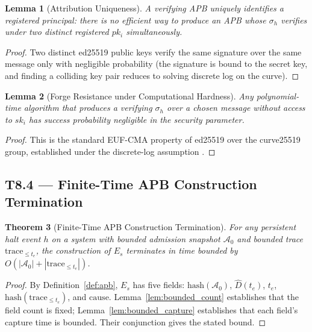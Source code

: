 \documentclass[11pt]{article}
\newtheorem{theorem}{Theorem}[section]
\newtheorem{lemma}[theorem]{Lemma}
\newcommand{\Azero}{\mathcal{A}_0}
\newcommand{\Dhat}{\widehat{D}}
\newcommand{\Es}{E_s}
\newcommand{\sigh}{\sigma_h}
\newcommand{\ski}{sk_i}
\newcommand{\pki}{pk_i}
\begin{document}
\begin{lemma}[Attribution Uniqueness]
\label{lem:attribution}
A verifying APB uniquely identifies a registered principal: there is
no efficient way to produce an APB whose $\sigh$ verifies under two
distinct registered $\pki$ simultaneously.
\end{lemma}

\begin{proof}
Two distinct ed25519 public keys verify the same signature over the
same message only with negligible probability (the signature is bound
to the secret key, and finding a colliding key pair reduces to
solving discrete log on the curve).
\end{proof}

\begin{lemma}[Forge Resistance under Computational Hardness]
\label{lem:forge}
Any polynomial-time algorithm that produces a verifying $\sigh$ over
a chosen message without access to $\ski$ has success probability
negligible in the security parameter.
\end{lemma}

\begin{proof}
This is the standard EUF-CMA property of ed25519 over the
curve25519 group, established under the discrete-log assumption
\citep{bernstein2012highspeed,boneh2014foundations}.
\end{proof}

\subsection{T8.4 --- Finite-Time APB Construction Termination}
\label{sec:t84}

\begin{theorem}[Finite-Time APB Construction Termination]
\label{thm:t84}
For any persistent halt event $h$ on a system with bounded admission
snapshot $\Azero$ and bounded trace $\mathrm{trace}_{\le t_e}$, the
construction of $\Es$ terminates in time bounded by
$O(|\Azero| + |\mathrm{trace}_{\le t_e}|)$.
\end{theorem}

\begin{proof}
By Definition~\ref{def:apb}, $\Es$ has five fields:
$\mathrm{hash}(\Azero)$, $\Dhat(t_e)$, $t_e$,
$\mathrm{hash}(\mathrm{trace}_{\le t_e})$, and $\mathrm{cause}$.
Lemma~\ref{lem:bounded_count} establishes that the field count is
fixed; Lemma~\ref{lem:bounded_capture} establishes that each field's
capture time is bounded. Their conjunction gives the stated bound.
\end{proof}
\end{document}
